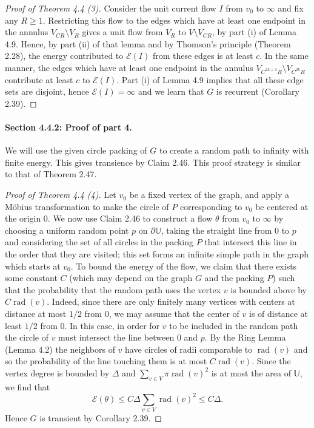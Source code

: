 \documentclass[UTF8,11pt]{ctexart}
\theoremstyle{definition}
\begin{document}
\begin{proof}[Proof of Theorem 4.4 (3)]
Consider the unit current flow $I$ from $v_0$ to $\infty$ and fix any $R\ge1$. Restricting this flow to the edges which have at least one endpoint in the annulus $V_{CR}\setminus V_R$ gives a unit flow from $V_R$ to $V\setminus V_{CR}$, by part (i) of Lemma 4.9. Hence, by part (ii) of that lemma and by Thomson's principle (Theorem 2.28), the energy contributed to $\mathcal E(I)$ from these edges is at least $c$.
In the same manner, the edges which have at least one endpoint in the annulus $V_{C^{2k+1}R}\setminus V_{C^{2k}R}$ contribute at least $c$ to $\mathcal E(I)$. Part (i) of Lemma 4.9 implies that all these edge sets are disjoint, hence $\mathcal E(I)=\infty$ and we learn that $G$ is recurrent (Corollary 2.39).
\end{proof}

\paragraph{Section 4.4.2: Proof of part 4.}
We will use the given circle packing of $G$ to create a random path to infinity with finite energy. This gives transience by Claim 2.46. This proof strategy is similar to that of Theorem 2.47.
\begin{proof}[Proof of Theorem 4.4 (4)]
Let $v_0$ be a fixed vertex of the graph, and apply a M\"obius transformation to make the circle of $P$ corresponding to $v_0$ be centered at the origin $0$.
We now use Claim 2.46 to construct a flow $\theta$ from $v_0$ to $\infty$ by choosing a uniform random point $p$ on $\partial\mathbb U$, taking the straight line from $0$ to $p$ and considering the set of all circles in the packing $P$ that intersect this line in the order that they are visited; this set forms an infinite simple path in the graph which starts at $v_0$.
To bound the energy of the flow, we claim that there exists some constant $C$ (which may depend on the graph $G$ and the packing $P$) such that the probability that the random path uses the vertex $v$ is bounded above by $C\operatorname{rad}(v)$. Indeed, since there are only finitely many vertices with centers at distance at most $1/2$ from $0$, we may assume that the center of $v$ is of distance at least $1/2$ from $0$. In this case, in order for $v$ to be included in the random path the circle of $v$ must intersect the line between $0$ and $p$. By the Ring Lemma (Lemma 4.2) the neighbors of $v$ have circles of radii comparable to $\operatorname{rad}(v)$ and so the probability of the line touching them is at most $C\operatorname{rad}(v)$. Since the vertex degree is bounded by $\Delta$ and $\sum_{v\in V}\pi\operatorname{rad}(v)^2$ is at most the area of $\mathbb U$, we find that
\[
\mathcal E(\theta)\le C\Delta\sum_{v\in V}\operatorname{rad}(v)^2\le C\Delta.
\]
Hence $G$ is transient by Corollary 2.39.
\end{proof}
\end{document}
